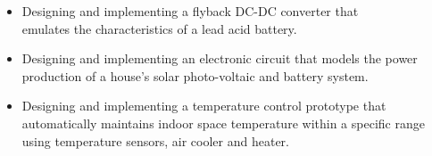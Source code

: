 \documentclass[10pt,a4paper,ragged2e]{altacv}
\begin{document}
\begin{itemize}
    \item Designing and implementing a flyback DC-DC converter that\\ emulates the characteristics of a lead acid battery.
    \item Designing and implementing an electronic circuit that models the power production of a house's solar photo-voltaic and battery system.
     \item Designing and implementing a temperature control prototype that automatically maintains indoor space temperature within a specific range using temperature sensors, air cooler and heater.
\end{itemize}




\nocite{*}



\end{document}
